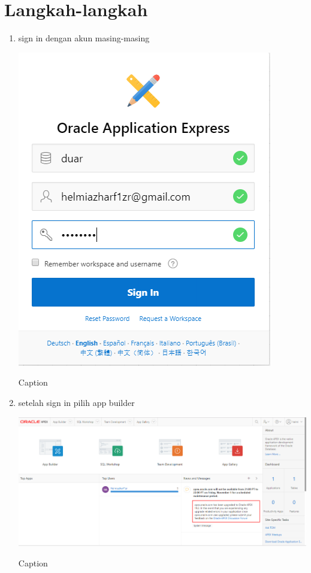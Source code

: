 ﻿\documentclass{article}
\begin{document}
\section{Langkah-langkah}
\begin{enumerate}
    \item sign in dengan akun masing-masing
    \begin{center}
        \centering
        \includegraphics[scale=0.5]{figures/1.PNG}
        \caption{Caption}
        \label{fig:my_label}
    \end{center}

    \item setelah sign in pilih app builder
    \begin{center}
        \centering
        \includegraphics[scale=0.4]{figures/2.PNG}
        \caption{Caption}
        \label{fig:my_label}
    \end{center}


\end{enumerate}
\end{document}
